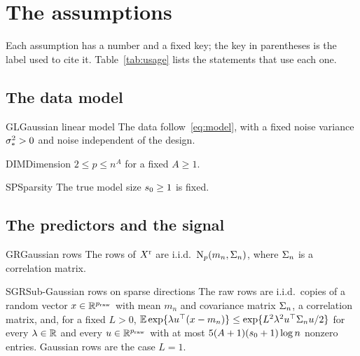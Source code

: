 \section{The assumptions}\label{sec:assumptions}

Each assumption has a number and a fixed key; the key in parentheses is the label used to cite it. Table~\ref{tab:usage}
lists the statements that use each one.

\subsection{The data model}\label{sec:a-all}

\begin{assumption}{GL}{Gaussian linear model}
The data follow~\eqref{eq:model}, with a fixed noise variance $\sigma_*^2>0$ and noise independent of the design.
\end{assumption}

\begin{assumption}{DIM}{Dimension}
$2\le p\le n^A$ for a fixed $A\ge1$.
\end{assumption}

\begin{assumption}{SP}{Sparsity}
The true model size $s_0\ge1$ is fixed.
\end{assumption}

\subsection{The predictors and the signal}\label{sec:a-post}

\begin{assumption}{GR}{Gaussian rows}
The rows of $X^{\mathrm r}$ are i.i.d.\ $\mathrm{N}_p(m_n,\Sigma_n)$, where $\Sigma_n$ is a correlation matrix.
\end{assumption}

\begin{assumption}{SGR}{Sub-Gaussian rows on sparse directions}
The raw rows are i.i.d.\ copies of a random vector $x\in\mathbb{R}^{p_{\mathrm{raw}}}$ with mean $m_n$ and covariance matrix $\Sigma_n$, a
correlation matrix, and, for a fixed $L>0$, $\operatorname{\mathbb{E}}\exp\{\lambda u^\top(x-m_n)\}\le\exp\{L^2\lambda^2u^\top\Sigma_n u/2\}$ for every
$\lambda\in\mathbb{R}$ and every $u\in\mathbb{R}^{p_{\mathrm{raw}}}$ with at most $5(A+1)(s_0+1)\log n$ nonzero entries. Gaussian rows  are
the case $L=1$.
\end{assumption}

